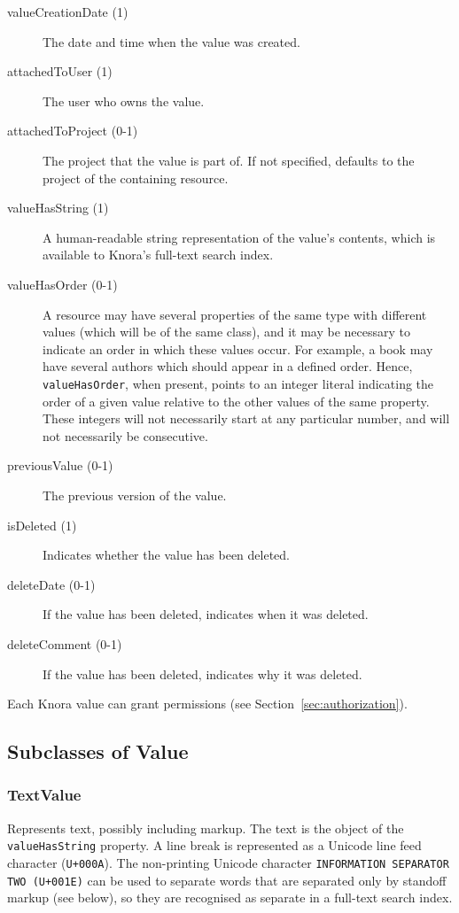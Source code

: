 \documentclass[12pt, a4paper]{article}
\begin{document}
\begin{description}
  \item[valueCreationDate (1)] The date and time when the value was created.
  \item[attachedToUser (1)] The user who owns the value.
  \item[attachedToProject (0-1)] The project that the value is part of. If not specified, defaults to the project of the containing resource.
  \item[valueHasString (1)] A human-readable string representation of the value's contents, which is available to Knora's full-text search index.
  \item[valueHasOrder (0-1)] A resource may have several properties of the same type with different values (which will be of the same class), and it may be necessary to indicate an order in which these values occur. For example, a book may have several authors which should appear in a defined order. Hence, \texttt{valueHasOrder}, when present, points to an integer literal indicating the order of a given value relative to the other values of the same property. These integers will not necessarily start at any particular number, and will not necessarily be consecutive.
  \item[previousValue (0-1)] The previous version of the value.
  \item[isDeleted (1)] Indicates whether the value has been deleted.
  \item[deleteDate (0-1)] If the value has been deleted, indicates when it was deleted.
  \item[deleteComment (0-1)] If the value has been deleted, indicates why it was deleted.
\end{description}

Each Knora value can grant permissions (see Section~\ref{sec:authorization}).

\subsection{Subclasses of Value}

\subsubsection{TextValue}

Represents text, possibly including markup. The text is the object of the \texttt{valueHasString} property. A line break is represented as a Unicode line feed character (\texttt{U+000A}). The non-printing Unicode character \texttt{INFORMATION SEPARATOR TWO (U+001E)} can be used to separate words that are separated only by standoff markup (see below), so they are recognised as separate in a full-text search index.
\end{document}
